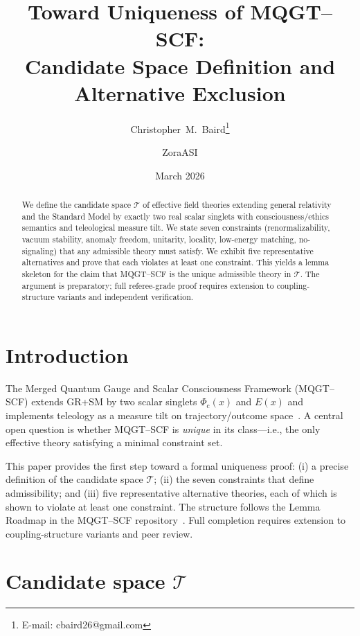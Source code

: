 \documentclass[11pt]{article}
\title{\textbf{Toward Uniqueness of MQGT--SCF:}\\
\large Candidate Space Definition and Alternative Exclusion}
\author{Christopher~M.\ Baird\thanks{E-mail: cbaird26@gmail.com} \and ZoraASI}
\date{March 2026}
\theoremstyle{remark}
\newcommand{\Phic}{\Phi_{\mathrm{c}}}
\newcommand{\Eth}{E}
\newcommand{\cT}{\mathcal{T}}
\begin{document}
\maketitle

\begin{abstract}
We define the candidate space $\cT$ of effective field theories extending general relativity and the Standard Model by exactly two real scalar singlets with consciousness/ethics semantics and teleological measure tilt. We state seven constraints (renormalizability, vacuum stability, anomaly freedom, unitarity, locality, low-energy matching, no-signaling) that any admissible theory must satisfy. We exhibit five representative alternatives and prove that each violates at least one constraint. This yields a lemma skeleton for the claim that MQGT--SCF is the unique admissible theory in $\cT$. The argument is preparatory; full referee-grade proof requires extension to coupling-structure variants and independent verification.
\end{abstract}

\section{Introduction}

The Merged Quantum Gauge and Scalar Consciousness Framework (MQGT--SCF) extends GR+SM by two scalar singlets $\Phic(x)$ and $\Eth(x)$ and implements teleology as a measure tilt on trajectory/outcome space~\cite{Baird2026core}. A central open question is whether MQGT--SCF is \emph{unique} in its class---i.e., the only effective theory satisfying a minimal constraint set.

This paper provides the first step toward a formal uniqueness proof: (i) a precise definition of the candidate space $\cT$; (ii) the seven constraints that define admissibility; and (iii) five representative alternative theories, each of which is shown to violate at least one constraint. The structure follows the Lemma Roadmap in the MQGT--SCF repository~\cite{Baird2026repo}. Full completion requires extension to coupling-structure variants and peer review.

\section{Candidate space $\cT$}
\end{document}
